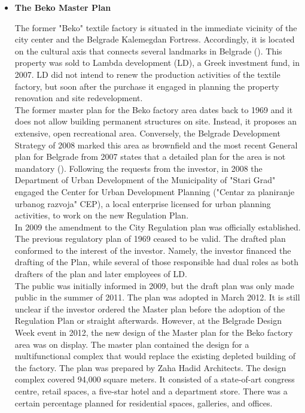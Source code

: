 \documentclass[11pt]{report}
\begin{document}
\begin{itemize}
\item \textbf{The Beko Master Plan}

The former "Beko" textile factory is situated in the immediate vicinity of the city center and the Belgrade Kalemegdan Fortress. Accordingly, it is located on the cultural axis that connects several landmarks in Belgrade (\href{Vukmirovic}{\citealt{doytchinov_belgrade:_2015}}). 
This property was sold to Lambda development (LD), a Greek investment fund, in 2007. LD did not intend to renew the production activities of the textile factory, but  soon after the purchase it engaged in planning the property renovation and site redevelopment. 
\\

The former master plan for the Beko factory area dates back to 1969 and it does not allow building permanent structures on site. Instead, it proposes an extensive, open recreational area.
Conversely, the Belgrade Development Strategy of 2008 marked this area as brownfield and the most recent General plan for Belgrade from 2007 states that a detailed plan for the area is not mandatory (\href{Vukmirovic}{\citealt{doytchinov_belgrade:_2015}}).
Following the requests from the investor, in 2008 the Department of Urban Development of the Municipality of "Stari Grad" engaged the Center for Urban Development Planning ("Centar za planiranje urbanog razvoja" CEP), a local enterprise licensed for urban planning activities, to work on the new Regulation Plan.
\\

In 2009 the amendment to the City Regulation plan was officially established. The previous regulatory plan of 1969 ceased to be valid. The drafted plan conformed to the interest of the investor. Namely, the investor financed the drafting of the Plan, while several of those responsible had dual roles as both drafters of the plan and later employees of LD.
\\

The public was initially informed in 2009, but the draft plan was only made public in the summer of 2011. The plan was adopted in March 2012. It is still unclear if the investor ordered the Master plan before the adoption of the Regulation Plan or straight afterwards. However, at the Belgrade Design Week event in 2012, the new design of the Master plan for the Beko factory area was on display. The master plan contained the design for a multifunctional complex that would replace the existing depleted building of the factory. The plan was prepared by Zaha Hadid Architects. The design complex covered 94,000 square meters. It consisted of a state-of-art congress centre, retail spaces, a five-star hotel and a department store. There was a certain percentage planned for residential spaces, galleries, and offices. 
\\


\end{itemize}
\end{document}
